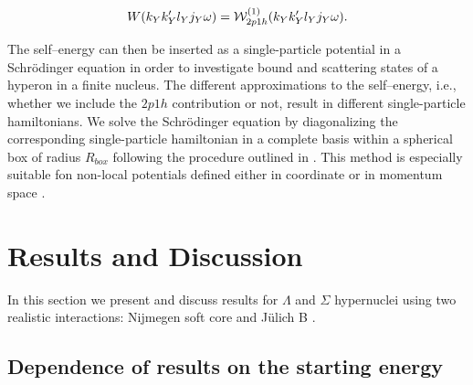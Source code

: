 \begin{equation}
    W(k_{Y}k_{Y}'l_{Y}j_{Y}\omega)=
       {\cal W}^{(1)}_{2p1h}(k_{Y}k_{Y}'l_{Y}j_{Y}\omega).
       \label{eq:imV}
\end{equation}




The self--energy can then be inserted as a single-particle
potential in a Schr\"o\-din\-ger equation in order to investigate
bound and scattering states of a  hyperon
in a finite nucleus. The different approximations to the
self--energy, i.e., whether we include the $2p1h$
contribution
or not, result in different single-particle hamiltonians. We solve
the Schr\"o\-din\-ger equation by diagonalizing the corresponding
single-particle hamiltonian in a complete basis within a spherical box
of radius $R_{box}$ following the procedure outlined in \cite{hjort96}. 
This method  is especially suitable fon non-local potentials defined either in coordinate or 
in momentum space \cite{bbmp92,hmp94}.  



\section{Results and Discussion}
\label{results}
In this section we present and discuss results for $\Lambda$
and $\Sigma$ hypernuclei
using two realistic interactions: 
Nijmegen soft core \cite{nijmegen} and J\"ulich B \cite{juelich}.

\subsection{Dependence of results on the starting energy}
\label{results1}

